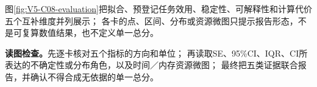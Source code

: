 \documentclass[UTF8,a4paper,11pt,openany]{ctexbook}
\begin{document}
\setcounter{page}{745}
\setcounter{chapter}{37}
\setcounter{section}{3}
\setcounter{figure}{5}
\pagestyle{headings}
图\ref{fig:V5-C08-evaluation}把拟合、预登记任务效用、稳定性、可解释性和计算代价五个互补维度并列展示；
各卡的点、区间、分布或资源微图只提示报告形态，不是可复算数值结果，也不定义单一总分。

\FloatBarrier
\noindent\textbf{读图检查。}先逐卡核对五个指标的方向和单位；
再读取SE、95\%CI、IQR、CI所表达的不确定性或分布角色，以及时间／内存资源微图；
最终把五类证据联合报告，并确认不得合成无依据的单一总分。
\end{document}
